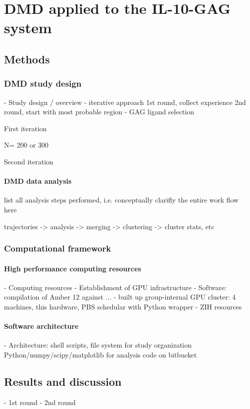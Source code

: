 \chapter{DMD applied to the IL-10-GAG system}

\section{Methods}

\subsection{DMD study design}


    - Study design / overview
        - iterative approach
            1st round, collect experience
            2nd round, start with most probable region
        - GAG ligand selection

First iteration


N= 200 or 300


Second iteration


\subsubsection{DMD data analysis}

 list all analysis steps performed, i.e. conceptually clarifly the entire
 work flow here

 trajectories -> analysis -> merging -> clustering -> cluster stats, etc


\subsection{Computational framework}

\subsubsection{High performance computing resources}


        - Computing resources
            - Establishment of GPU infrastructure
                - Software: compilation of Amber 12 against ...
                - built up group-internal GPU cluster:
                    4 machines, this hardware, PBS schedular with Python wrapper
                - ZIH resources

\subsubsection{Software architecture}

        - Architecture:
            shell scripts, file system for study organization
            Python/numpy/scipy/matplotlib for analysis
            code on bitbucket



\section{Results and discussion}

        - 1st round
        - 2nd round
